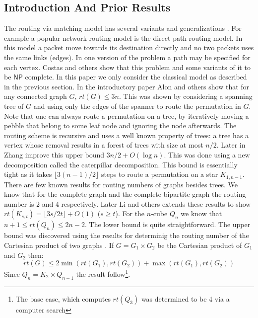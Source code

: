 \documentclass[runningheads,a4paper]{llncs}
\begin{document}
\subsection{Introduction And Prior Results}
The routing via matching model has several variants and generalizations \cite{5,6,8}. For example a popular network routing model is the direct path routing model. In this model a packet move towards its destination directly and no two packets uses the same links (edges). In one version of the problem a path may be specified for each vertex. Costas and others \cite{8} show that this problem and some variants of it to be $\mathsf{NP}$ complete.  In this paper we only consider the classical model as described in the previous section.  In the introductory paper Alon and others \cite{5}  show that for any connected graph $G$, $rt(G) \le 3n$. This was shown by considering a spanning tree of $G$ and using only the edges of the spanner to route the permutation in $G$. Note that one can always route a permutation on a tree, by iteratively moving a pebble that belong to some leaf node and ignoring the node afterwards. The routing scheme is recursive and uses a well known property of trees: a tree has a vertex whose removal results in a forest of trees with size at most $n/2$.
Later in \cite{7} Zhang improve this upper bound $3n/2 + O(\log n)$. This was done using a new decomposition called the caterpillar decomposition. This bound is essentially tight as it takes $\lfloor{3(n-1)/2}\rfloor$ steps to route a permutation on a star $K_{1,n-1}$. There are  few known results for routing numbers of graphs besides trees. We know that for the complete graph and the complete bipartite graph the routing number is 2 and 4 respectively\cite{5}. Later Li and others \cite{6} extends these results to show $rt(K_{s,t}) = \lfloor 3s/2t \rfloor + O(1)$ ($s \ge t$). For the $n$-cube $Q_n$ we know that $n+1 \le rt(Q_n) \le 2n-2$. The lower bound is quite straightforward. The upper bound was discovered using the results for determinig the routing number of the Cartesian product of two graphs \cite{5}. If $G = G_1  \times  G_2$ be the Cartesian product of $G_1$ and $G_2$ then: $$rt(G) \le 2 \min(rt(G_1),rt(G_2))+\max(rt(G_1),rt(G_2))$$
Since $Q_n = K_2 \times Q_{n-1}$ the result follow\footnote{The base case, which computes $rt(Q_3)$ was determined to be 4 via a computer search\cite{6}}. 
\end{document}
